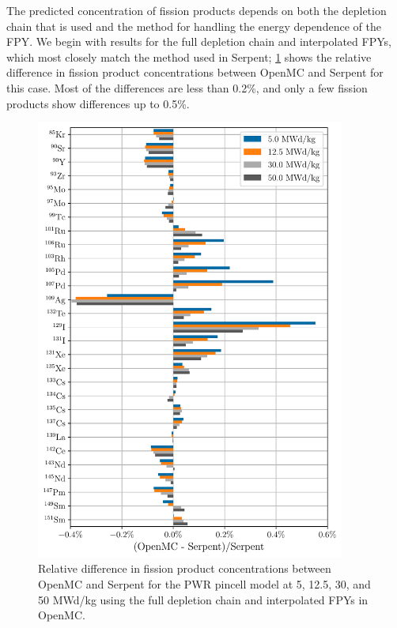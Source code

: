 \documentclass[3p,authoryear]{elsarticle}
\begin{document}
The predicted concentration of fission products depends on both the depletion
chain that is used and the method for handling the energy dependence of the FPY.
We begin with results for the full depletion chain and interpolated FPYs, which
most closely match the method used in Serpent; \cref{fig:pwr-fp-full-average}
shows the relative difference in fission product concentrations between OpenMC
and Serpent for this case. Most of the differences are less than 0.2\%, and only
a few fission products show differences up to 0.5\%.
\begin{figure}[H]
  \centering
  \includegraphics[width=4in]{figures/pwr_fp_full_average.pdf}
  \caption{Relative difference in fission product concentrations between OpenMC
  and Serpent for the PWR pincell model at 5, 12.5, 30, and 50 MWd/kg using the
  full depletion chain and interpolated FPYs in OpenMC.}
  \label{fig:pwr-fp-full-average}
\end{figure}
\end{document}
